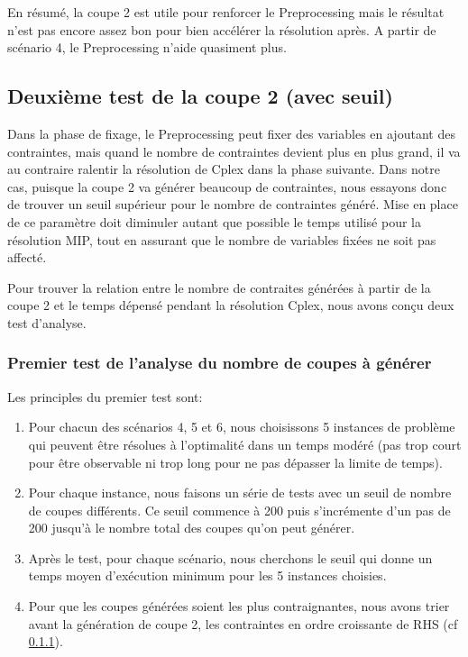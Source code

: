 \documentclass[twoside,fleqn]{EPURapport}
\begin{document}
En résumé, la coupe 2 est utile pour renforcer le Preprocessing mais le résultat n'est pas encore assez bon pour bien accélérer la résolution après. A partir de scénario 4, le Preprocessing n'aide quasiment plus.


\subsection{Deuxième test de la coupe 2 (avec seuil)}
Dans la phase de fixage, le Preprocessing peut fixer des variables en ajoutant des contraintes, mais quand le nombre de contraintes devient plus en plus grand, il va au contraire ralentir la résolution de Cplex dans la phase suivante. Dans notre cas, puisque la coupe 2 va générer beaucoup de contraintes, nous essayons donc de trouver un seuil supérieur pour le nombre de contraintes généré. Mise en place de ce paramètre doit diminuler autant que possible le temps utilisé pour la résolution MIP, tout en assurant que le nombre de variables fixées ne soit pas affecté.

Pour trouver la relation entre le nombre de contraites générées à partir de la coupe 2 et le temps dépensé pendant la résolution Cplex, nous avons conçu deux test d'analyse.
\subsubsection{Premier test de l'analyse du nombre de coupes à générer}
Les principles du premier test sont:
\begin{enumerate}
	\item Pour chacun des scénarios 4, 5 et 6, nous choisissons 5 instances de problème qui peuvent être résolues à l'optimalité dans un temps modéré (pas trop court pour être observable ni trop long pour ne pas dépasser la limite de temps).
	\item Pour chaque instance, nous faisons un série de tests avec un seuil de nombre de coupes différents. Ce seuil commence à 200 puis s'incrémente d'un pas de 200 jusqu'à le nombre total des coupes qu'on peut générer.
	\item Après le test, pour chaque scénario, nous cherchons le seuil qui donne un temps moyen d'exécution minimum pour les 5 instances choisies.
	\item Pour que les coupes générées soient les plus contraignantes, nous avons trier avant la génération de coupe 2, les contraintes en ordre croissante de RHS (cf \ref{}).
\end{enumerate}
	
\end{document}
